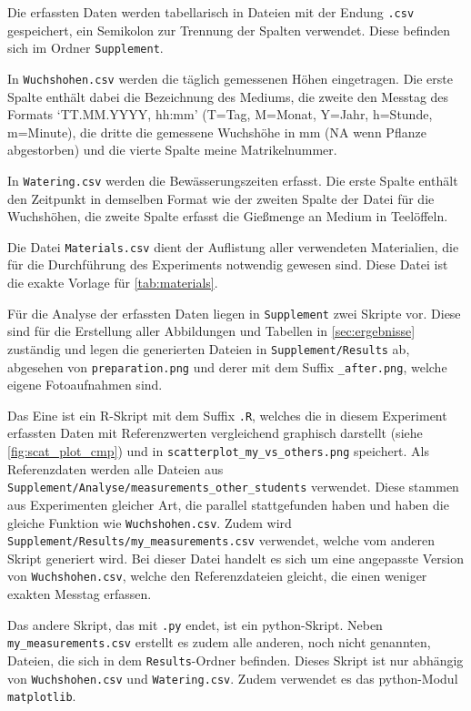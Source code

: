     \newpage
    Die erfassten Daten werden tabellarisch in Dateien mit der Endung \texttt{.csv} gespeichert, ein Semikolon zur Trennung der Spalten verwendet. Diese befinden sich im Ordner \texttt{Supplement}.

    In \texttt{Wuchshohen.csv} werden die täglich gemessenen Höhen eingetragen. Die erste Spalte enthält dabei die Bezeichnung des Mediums, die zweite den Messtag des Formats `TT.MM.YYYY, hh:mm' (T=Tag, M=Monat, Y=Jahr, h=Stunde, m=Minute), die dritte die gemessene Wuchshöhe in mm (NA wenn Pflanze abgestorben) und die vierte Spalte meine Matrikelnummer.

    In \texttt{Watering.csv} werden die Bewässerungszeiten erfasst. Die erste Spalte enthält den Zeitpunkt in demselben Format wie der zweiten Spalte der Datei für die Wuchshöhen, die zweite Spalte erfasst die Gießmenge an Medium in Teelöffeln.

    Die Datei \texttt{Materials.csv} dient der Auflistung aller verwendeten Materialien, die für die Durchführung des Experiments notwendig gewesen sind. Diese Datei ist die exakte Vorlage für \autoref{tab:materials}.

    Für die Analyse der erfassten Daten liegen in \texttt{Supplement} zwei Skripte vor. Diese sind für die Erstellung aller Abbildungen und Tabellen in \autoref{sec:ergebnisse} zuständig und legen die generierten Dateien in \texttt{Supplement/Results} ab, abgesehen von \texttt{preparation.png} und derer mit dem Suffix \texttt{\_after.png}, welche eigene Fotoaufnahmen sind.

    Das Eine ist ein R-Skript mit dem Suffix \texttt{.R}, welches die in diesem Experiment erfassten Daten mit Referenzwerten vergleichend graphisch darstellt (siehe \autoref{fig:scat_plot_cmp}) und in \texttt{scatterplot\_my\_vs\_others.png} speichert. Als Referenzdaten werden alle Dateien aus \texttt{Supplement/Analyse/measurements\_other\_students} verwendet. Diese stammen aus Experimenten gleicher Art, die parallel stattgefunden haben und haben die gleiche Funktion wie \texttt{Wuchshohen.csv}. Zudem wird \texttt{Supplement/Results/my\_measurements.csv} verwendet, welche vom anderen Skript generiert wird. Bei dieser Datei handelt es sich um eine angepasste Version von \texttt{Wuchshohen.csv}, welche den Referenzdateien gleicht, die einen weniger exakten Messtag erfassen.

    Das andere Skript, das mit \texttt{.py} endet, ist ein python-Skript. Neben \texttt{my\_measurements.csv} erstellt es zudem alle anderen, noch nicht genannten, Dateien, die sich in dem \texttt{Results}-Ordner befinden. Dieses Skript ist nur abhängig von \texttt{Wuchshohen.csv} und \texttt{Watering.csv}. Zudem verwendet es das python-Modul \texttt{matplotlib}.


